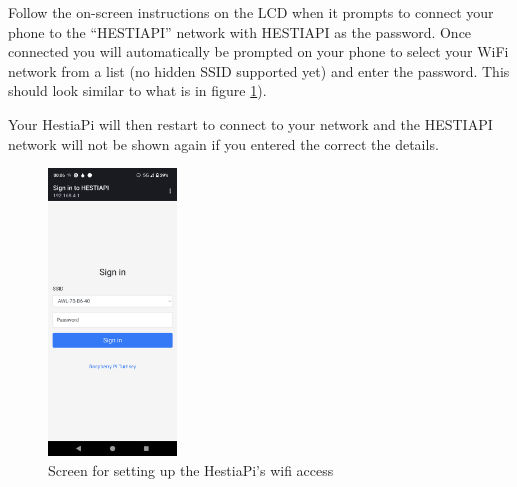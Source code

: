 Follow the on-screen instructions on the LCD when it prompts to connect your
phone to the ``HESTIAPI'' network with HESTIAPI as the password. Once connected
you will automatically be prompted on your phone to select your WiFi network
from a list (no hidden SSID supported yet) and enter the password. This should
look similar to what is in figure \ref{fig:wifi_setup}).

Your HestiaPi will then restart to connect to your network and the HESTIAPI
network will not be shown again if you entered the correct the details.

\begin{figure}
  \centering
  \includegraphics[height=3in]{img/wifi-setup.png}
  \caption{Screen for setting up the HestiaPi's wifi access}
  \label{fig:wifi_setup}
\end{figure}
